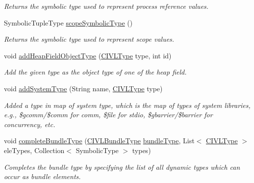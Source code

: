 \begin{DoxyCompactItemize}
\begin{DoxyCompactList}\small\item\em Returns the symbolic type used to represent process reference values. \end{DoxyCompactList}\item 
Symbolic\+Tuple\+Type \hyperlink{interfaceedu_1_1udel_1_1cis_1_1vsl_1_1civl_1_1model_1_1IF_1_1CIVLTypeFactory_a492187dd08fb06b6af23bf3ee0ed4c0f}{scope\+Symbolic\+Type} ()
\begin{DoxyCompactList}\small\item\em Returns the symbolic type used to represent scope values. \end{DoxyCompactList}\item 
void \hyperlink{interfaceedu_1_1udel_1_1cis_1_1vsl_1_1civl_1_1model_1_1IF_1_1CIVLTypeFactory_a8ae77a4351158e2610bb3051398b4829}{add\+Heap\+Field\+Object\+Type} (\hyperlink{interfaceedu_1_1udel_1_1cis_1_1vsl_1_1civl_1_1model_1_1IF_1_1type_1_1CIVLType}{C\+I\+V\+L\+Type} type, int id)
\begin{DoxyCompactList}\small\item\em Add the given type as the object type of one of the heap field. \end{DoxyCompactList}\item 
void \hyperlink{interfaceedu_1_1udel_1_1cis_1_1vsl_1_1civl_1_1model_1_1IF_1_1CIVLTypeFactory_a1dbcbe0dc45560da0b35bc847ae1879d}{add\+System\+Type} (String name, \hyperlink{interfaceedu_1_1udel_1_1cis_1_1vsl_1_1civl_1_1model_1_1IF_1_1type_1_1CIVLType}{C\+I\+V\+L\+Type} type)
\begin{DoxyCompactList}\small\item\em Added a type in map of system type, which is the map of types of system libraries, e.\+g., \$gcomm/\$comm for comm, \$file for stdio, \$gbarrier/\$barrier for concurrency, etc. \end{DoxyCompactList}\item 
void \hyperlink{interfaceedu_1_1udel_1_1cis_1_1vsl_1_1civl_1_1model_1_1IF_1_1CIVLTypeFactory_abe26d011e62a5cbfef194c28aeed51be}{complete\+Bundle\+Type} (\hyperlink{interfaceedu_1_1udel_1_1cis_1_1vsl_1_1civl_1_1model_1_1IF_1_1type_1_1CIVLBundleType}{C\+I\+V\+L\+Bundle\+Type} \hyperlink{interfaceedu_1_1udel_1_1cis_1_1vsl_1_1civl_1_1model_1_1IF_1_1CIVLTypeFactory_a6f39e2e540a2c398a2491809304561e9}{bundle\+Type}, List$<$ \hyperlink{interfaceedu_1_1udel_1_1cis_1_1vsl_1_1civl_1_1model_1_1IF_1_1type_1_1CIVLType}{C\+I\+V\+L\+Type} $>$ ele\+Types, Collection$<$ Symbolic\+Type $>$ types)
\begin{DoxyCompactList}\small\item\em Completes the bundle type by specifying the list of all dynamic types which can occur as bundle elements. \end{DoxyCompactList}\item 

\end{DoxyCompactItemize}
